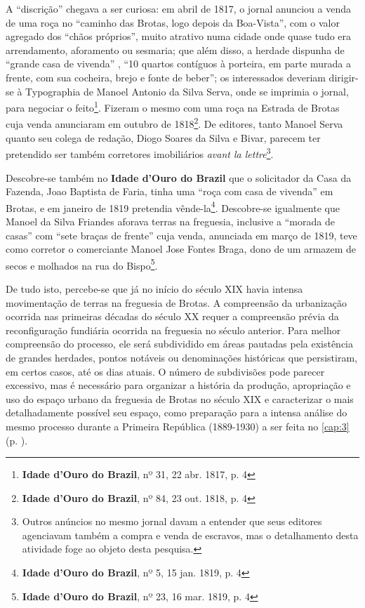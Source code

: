 A ``discrição'' chegava a ser curiosa: em abril de 1817, o jornal anunciou a venda de uma roça no ``caminho das Brotas, logo depois da Boa-Vista'', com o valor agregado dos ``chãos próprios'', muito atrativo numa cidade onde quase tudo era arrendamento, aforamento ou sesmaria; que além disso, a herdade dispunha de ``grande casa de vivenda'' , ``10 quartos contíguos à porteira, em parte murada a frente, com sua cocheira, brejo e fonte de beber''; os interessados deveriam dirigir-se à Typographia de Manoel Antonio da Silva Serva, onde se imprimia o jornal, para negociar o feito\footnote{\textbf{Idade d'Ouro do Brazil}, nº 31, 22 abr. 1817, p. 4}. Fizeram o mesmo com uma roça na Estrada de Brotas cuja venda anunciaram em outubro de 1818\footnote{\textbf{Idade d'Ouro do Brazil}, nº 84, 23 out. 1818, p. 4}. De editores, tanto Manoel Serva quanto seu colega de redação, Diogo Soares da Silva e Bivar, parecem ter pretendido ser também corretores imobiliários \textit{avant la lettre}\footnote{Outros anúncios no mesmo jornal davam a entender que seus editores agenciavam também a compra e venda de escravos, mas o detalhamento desta atividade foge ao objeto desta pesquisa.}.

Descobre-se também no \textbf{Idade d'Ouro do Brazil} que o solicitador da Casa da Fazenda, Joao Baptista de Faria, tinha uma ``roça com casa de vivenda'' em Brotas, e em janeiro de 1819 pretendia vênde-la\footnote{\textbf{Idade d'Ouro do Brazil}, nº 5, 15 jan. 1819, p. 4}. Descobre-se igualmente que Manoel da Silva Friandes aforava terras na freguesia, inclusive a ``morada de casas'' com ``sete braças de frente'' cuja venda, anunciada em março de 1819, teve como corretor o comerciante Manoel Jose Fontes Braga, dono de um armazem de secos e molhados na rua do Bispo\footnote{\textbf{Idade d'Ouro do Brazil}, nº 23, 16 mar. 1819, p. 4}.

De tudo isto, percebe-se que já no início do século XIX havia intensa movimentação de terras na freguesia de Brotas. A compreensão da urbanização ocorrida nas primeiras décadas do século XX requer a compreensão prévia da reconfiguração fundiária ocorrida na freguesia no século anterior. Para melhor compreensão do processo, ele será subdividido em áreas pautadas pela existência de grandes herdades, pontos notáveis ou denominações históricas que persistiram, em certos casos, até os dias atuais. O número de subdivisões pode parecer excessivo, mas é necessário para organizar a história da produção, apropriação e uso do espaço urbano da freguesia de Brotas no século XIX e caracterizar o mais detalhadamente possível seu espaço, como preparação para a intensa análise do mesmo processo durante a Primeira República (1889-1930) a ser feita no \autoref{cap:3} (p. \pageref{cap:3}).

